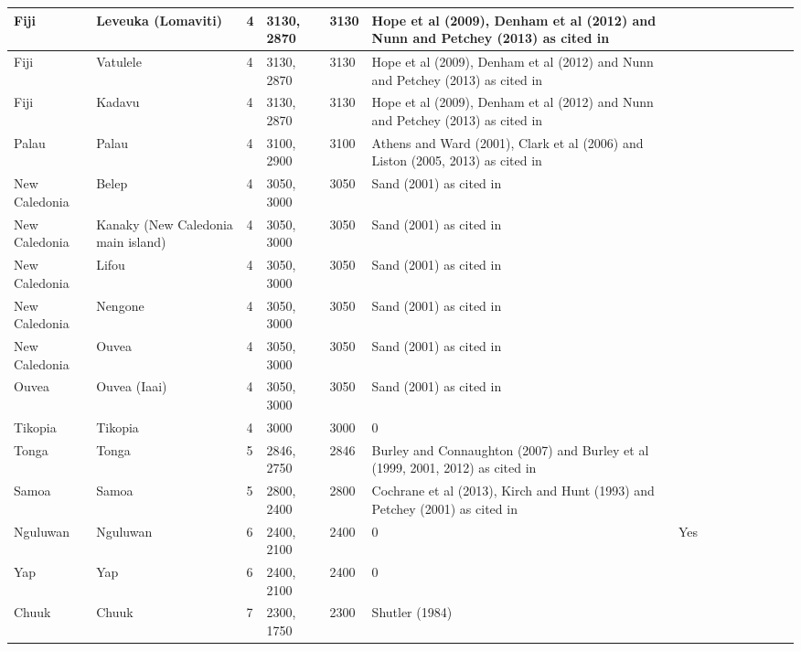 \documentclass[draft,10pt]{article} %
\begin{document}
\begin{landscape}
\begin{longtable}{| p{3cm}| p{4cm}| p{4cm}|p{2cm}|p{2cm}|p{2cm}|p{2cm}|p{2cm}|p{2cm}|p{2cm}|p{2cm}|p{2cm}|p{2cm}|p{2cm}}
 Fiji & Leveuka (Lomaviti) & 4 & 3130, 2870 & 3130 & Hope et al (2009), Denham et al (2012) and Nunn and Petchey (2013) as cited in \citet{rieth_cochrane_2018} &   \\ \hline
 Fiji & Vatulele & 4 & 3130, 2870 & 3130 & Hope et al (2009), Denham et al (2012) and Nunn and Petchey (2013) as cited in \citet{rieth_cochrane_2018} &   \\ \hline
 Fiji & Kadavu & 4 & 3130, 2870 & 3130 & Hope et al (2009), Denham et al (2012) and Nunn and Petchey (2013) as cited in \citet{rieth_cochrane_2018} &   \\ \hline
 Palau & Palau & 4 & 3100, 2900 & 3100 & Athens and Ward (2001), Clark et al (2006) and Liston (2005, 2013) as cited in \citet{rieth_cochrane_2018} &   \\ \hline
 New Caledonia & Belep & 4 & 3050, 3000 & 3050 & Sand (2001) as cited in \citet{rieth_cochrane_2018} &   \\ \hline
 New Caledonia & Kanaky (New Caledonia main island) & 4 & 3050, 3000 & 3050 & Sand (2001) as cited in \citet{rieth_cochrane_2018} &   \\ \hline
 New Caledonia & Lifou & 4 & 3050, 3000 & 3050 & Sand (2001) as cited in \citet{rieth_cochrane_2018} &   \\ \hline
 New Caledonia & Nengone & 4 & 3050, 3000 & 3050 & Sand (2001) as cited in \citet{rieth_cochrane_2018} &   \\ \hline
 New Caledonia & Ouvea & 4 & 3050, 3000 & 3050 & Sand (2001) as cited in \citet{rieth_cochrane_2018} &   \\ \hline
 Ouvea & Ouvea (Iaai) & 4 & 3050, 3000 & 3050 & Sand (2001) as cited in \citet{rieth_cochrane_2018} &   \\ \hline
 Tikopia & Tikopia & 4 & 3000 & 3000 & \citet{carson2012recent}  0 &   \\ \hline
 Tonga & Tonga & 5 & 2846, 2750 & 2846 & Burley and Connaughton (2007) and Burley et al (1999, 2001, 2012) as cited in \citet{rieth_cochrane_2018} &   \\ \hline
 Samoa & Samoa & 5 & 2800, 2400 & 2800 & Cochrane et al (2013), Kirch and Hunt (1993) and Petchey (2001) as cited in \citet{rieth_cochrane_2018} &   \\ \hline
 Nguluwan & Nguluwan & 6 & 2400, 2100 & 2400 & \citet{Napolitano_et_al_yap}  0 & Yes \\ \hline
 Yap & Yap & 6 & 2400, 2100 & 2400 & \citet{Napolitano_et_al_yap}  0 &   \\ \hline
 Chuuk & Chuuk & 7 & 2300, 1750 & 2300 & Shutler (1984)  \citet{rieth_cochrane_2018} &   \\ \hline

\end{longtable}
\end{landscape}
\end{document}
